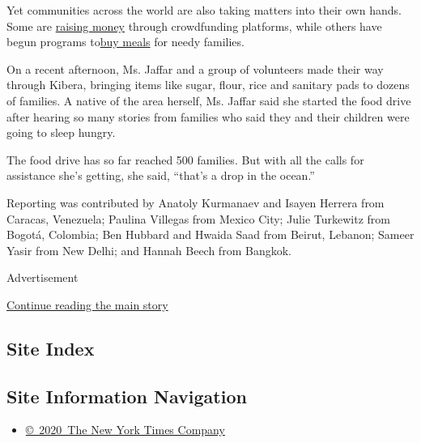 Yet communities across the world are also taking matters into their own
hands. Some are
\href{https://secure.changa.co.ke/myweb/share/39216}{raising money}
through crowdfunding platforms, while others have begun programs
to\href{https://www.rappi.com.co/tienda/menu-solidario}{buy meals} for
needy families.

On a recent afternoon, Ms. Jaffar and a group of volunteers made their
way through Kibera, bringing items like sugar, flour, rice and sanitary
pads to dozens of families. A native of the area herself, Ms. Jaffar
said she started the food drive after hearing so many stories from
families who said they and their children were going to sleep hungry.

The food drive has so far reached 500 families. But with all the calls
for assistance she's getting, she said, ``that's a drop in the ocean.''

Reporting was contributed by Anatoly Kurmanaev and Isayen Herrera from
Caracas, Venezuela; Paulina Villegas from Mexico City; Julie Turkewitz
from Bogotá, Colombia; Ben Hubbard and Hwaida Saad from Beirut, Lebanon;
Sameer Yasir from New Delhi; and Hannah Beech from Bangkok.

Advertisement

\protect\hyperlink{after-bottom}{Continue reading the main story}

\hypertarget{site-index}{%
\subsection{Site Index}\label{site-index}}

\hypertarget{site-information-navigation}{%
\subsection{Site Information
Navigation}\label{site-information-navigation}}

\begin{itemize}
\tightlist
\item
  \href{https://help.nytimes.com/hc/en-us/articles/115014792127-Copyright-notice}{©~2020~The
  New York Times Company}
\end{itemize}

